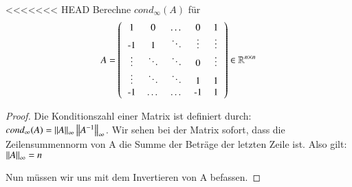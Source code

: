 \begin{exercise}
<<<<<<< HEAD
Berechne $cond_\infty(A)$ für
\begin{equation*}
A = \left(
\begin{tabular}{ccccc}
1 & 0 & $\dots$ & 0 & 1 \\
-1 & 1 & $\ddots$ & $\vdots$ & $\vdots$ \\
$\vdots$ & $\ddots$ & $\ddots$ & 0 & $\vdots$ \\
$\vdots$ & $\ddots$ & $\ddots$ & 1 & 1 \\
-1 & $\dots$ & $\dots$ & -1 & 1 \\
\end{tabular}
\right) \in \R^{n\times n}
\end{equation*}
\end{exercise}

\begin{proof}
Die Konditionszahl einer Matrix ist definiert durch: $cond_\infty(A) = \left\lVert A\right\rVert_\infty \left\lVert A^{-1}\right\rVert_\infty$. Wir sehen bei der Matrix sofort, dass die Zeilensummennorm von A die Summe der Beträge der letzten Zeile ist. Also gilt: $\left\lVert A\right\rVert_\infty = n$

Nun müssen wir uns mit dem Invertieren von A befassen. 


\end{proof}
